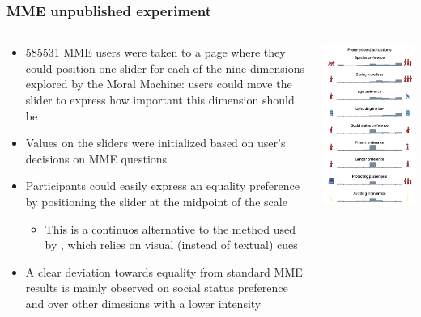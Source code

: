 \documentclass[aspectratio=169]{beamer}
\begin{document}
\begin{frame}
    \frametitle{MME unpublished experiment}
    \begin{columns}[totalwidth=1.0\textwidth]
        \begin{column}{0.6\linewidth}
            \begin{itemize}
                \item \num{585531} MME users were taken to a page where they could position one slider for each of the nine dimensions explored by the Moral Machine: users could move the slider to express how important this dimension should be
                \item Values on the sliders were initialized based on user's decisions on MME questions
                \item Participants could easily express an equality preference by positioning the slider at the midpoint of the scale
                      \begin{itemize}
                          \item This is a continuos alternative to the method used by \citeauthor{against-mme}, which relies on visual (instead of textual) cues
                      \end{itemize}
                \item A clear deviation towards equality from standard MME results is mainly observed on social status preference and over other dimesions with a lower intensity
            \end{itemize}
        \end{column}
        \begin{column}{0.35\linewidth}
            \includegraphics[width=0.7\linewidth]{assets/reply-against-mme-experiment.png}

\end{column}
\end{columns}
\end{frame}
\end{document}
